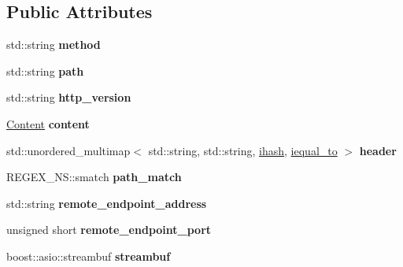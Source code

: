 \subsection*{Public Attributes}
\begin{DoxyCompactItemize}
\item 
\mbox{\label{classhttp_1_1_server_base_1_1_request_a17c16c0e1de5fb3edd424738613554da}} 
std\+::string {\bfseries method}
\item 
\mbox{\label{classhttp_1_1_server_base_1_1_request_ac0de486c0d382d593a9054dc0ec04d05}} 
std\+::string {\bfseries path}
\item 
\mbox{\label{classhttp_1_1_server_base_1_1_request_aa30474d3bc9027bd8fb96e7e14fe7dbe}} 
std\+::string {\bfseries http\+\_\+version}
\item 
\mbox{\label{classhttp_1_1_server_base_1_1_request_a4cffa26ae6ac99ac2aaccae69acbaf95}} 
\hyperlink{classhttp_1_1_server_base_1_1_content}{Content} {\bfseries content}
\item 
\mbox{\label{classhttp_1_1_server_base_1_1_request_ac495715ef20b2e6b246c25742ff5350f}} 
std\+::unordered\+\_\+multimap$<$ std\+::string, std\+::string, \hyperlink{classhttp_1_1_server_base_1_1_request_1_1ihash}{ihash}, \hyperlink{classhttp_1_1_server_base_1_1_request_1_1iequal__to}{iequal\+\_\+to} $>$ {\bfseries header}
\item 
\mbox{\label{classhttp_1_1_server_base_1_1_request_a34426c0777699d5cf216637e21d66d73}} 
R\+E\+G\+E\+X\+\_\+\+N\+S\+::smatch {\bfseries path\+\_\+match}
\item 
\mbox{\label{classhttp_1_1_server_base_1_1_request_a73700fc034f5132b50d11456e5e59c84}} 
std\+::string {\bfseries remote\+\_\+endpoint\+\_\+address}
\item 
\mbox{\label{classhttp_1_1_server_base_1_1_request_a21dde765df3c4176fa63f13fbffb3f74}} 
unsigned short {\bfseries remote\+\_\+endpoint\+\_\+port}
\item 
\mbox{\label{classhttp_1_1_server_base_1_1_request_aa138a7688780c34af7a69e85ffba30a3}} 
boost\+::asio\+::streambuf {\bfseries streambuf}
\end{DoxyCompactItemize}

